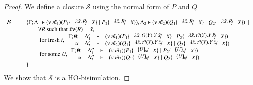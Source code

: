 \begin{proof}
	\noi We define a closure $\mathcal{S}$ using the normal form of $P$ and $Q$

	\[
		\begin{array}{rcll}
			\mathcal{S} &=& \set{\horel{\Gamma}{\Delta_1}{\newsp{\tilde{m_1}}{P_1 \subst{\abs{\tilde{x}}{R}}{X} \Par P_2 \subst{\abs{\tilde{x}}{R}}{X}}}{,}{\Delta_2}{\newsp{\tilde{m_2}}{Q_1 \subst{\abs{\tilde{x}}{R}}{X} \Par Q_2 \subst{\abs{\tilde{x}}{R}}{X}}} \setbar \\
			&& \qquad \forall R \textrm{ such that } \fv{R} = \tilde{x},\\
			&& \qquad \textrm{ for fresh } t,
			\mhorel{\Gamma}{\Delta_1'}
			{\newsp{\tilde{m_1}}{P_1 \subst{\abs{\tilde{x}}{\binp{t}{Y} \appl{Y}{\tilde{x}}}}{X} \Par P_2 \subst{\abs{\tilde{x}}{\binp{t}{Y} \appl{Y}{\tilde{x}}}}{X}}}
			{\wb}
			{\Delta_2'}{}{\newsp{\tilde{m_2}}{Q_1 \subst{\abs{\tilde{x}}{\binp{t}{Y} \appl{Y}{\tilde{x}}}}{X} \Par Q_2 \subst{\abs{\tilde{x}}{\binp{t}{Y} \appl{Y}{\tilde{x}}}}{X}}}\\
			&& \qquad \textrm{ for some } U, 
			\mhorel{\Gamma}{\Delta_1''}
			{\newsp{\tilde{m_1}}{P_1 \subst{\omapchar{U}}{X} \Par P_2 \subst{\omapchar{U}}{X}}}
			{\wb}
			{\Delta_2''}{}{\newsp{\tilde{m_2}}{Q_1 \subst{\omapchar{U}}{X} \Par Q_2 \subst{\omapchar{U}}{X}}} \\
			&&}
		\end{array}
	\]
%
%
	\noi We show that $\mathcal{S}$ is a HO-bisimulation.


\end{proof}

